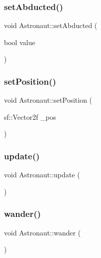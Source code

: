 \subsubsection{\texorpdfstring{set\+Abducted()}{setAbducted()}}
{\footnotesize\ttfamily void Astronaut\+::set\+Abducted (\begin{DoxyParamCaption}\item[{bool}]{value }\end{DoxyParamCaption})}

\mbox{\label{class_astronaut_a2dff61a54b10d5fb38f68d2f63668387}} 
\subsubsection{\texorpdfstring{set\+Position()}{setPosition()}}
{\footnotesize\ttfamily void Astronaut\+::set\+Position (\begin{DoxyParamCaption}\item[{sf\+::\+Vector2f}]{\+\_\+pos }\end{DoxyParamCaption})}

\mbox{\label{class_astronaut_acb963c04f91f1cda4aac81f5a51e1f34}} 
\subsubsection{\texorpdfstring{update()}{update()}}
{\footnotesize\ttfamily void Astronaut\+::update (\begin{DoxyParamCaption}{ }\end{DoxyParamCaption})}

\mbox{\label{class_astronaut_a39d7e43f8604bf561570e2eb2564a8fa}} 
\subsubsection{\texorpdfstring{wander()}{wander()}}
{\footnotesize\ttfamily void Astronaut\+::wander (\begin{DoxyParamCaption}{ }\end{DoxyParamCaption})}

